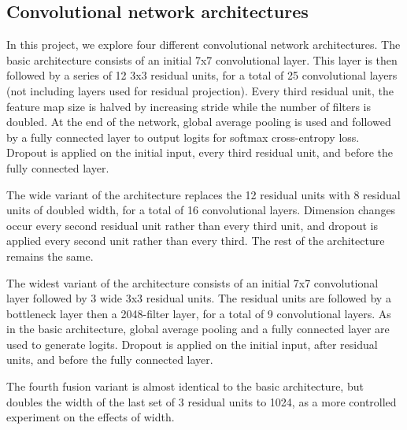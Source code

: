 \documentclass[10pt,twocolumn,letterpaper]{article}
\begin{document}
\subsection{Convolutional network architectures}
In this project, we explore four different convolutional network architectures. The basic architecture consists of an initial 7x7 convolutional layer. This layer is then followed by a series of 12 3x3 residual units, for a total of 25 convolutional layers (not including layers used for residual projection). Every third residual unit, the feature map size is halved by increasing stride while the number of filters is doubled. At the end of the network, global average pooling is used and followed by a fully connected layer to output logits for softmax cross-entropy loss. Dropout is applied on the initial input, every third residual unit, and before the fully connected layer.

The wide variant of the architecture replaces the 12 residual units with 8 residual units of doubled width, for a total of 16 convolutional layers. Dimension changes occur every second residual unit rather than every third unit, and dropout is applied every second unit rather than every third. The rest of the architecture remains the same.

The widest variant of the architecture consists of an initial 7x7 convolutional layer followed by 3 wide 3x3 residual units. The residual units are followed by a bottleneck layer then a 2048-filter layer, for a total of 9 convolutional layers. As in the basic architecture, global average pooling and a fully connected layer are used to generate logits. Dropout is applied on the initial input, after residual units, and before the fully connected layer.

The fourth fusion variant is almost identical to the basic architecture, but doubles the width of the last set of 3 residual units to 1024, as a more controlled experiment on the effects of width.
\end{document}

